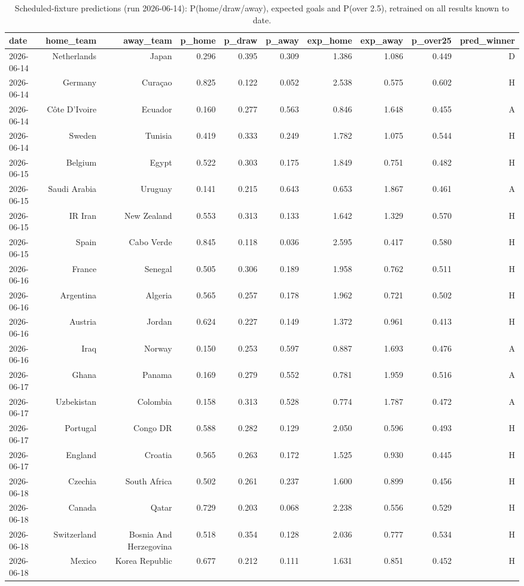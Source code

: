 \begin{table}[t]
  \centering
  \caption{Scheduled-fixture predictions (run 2026-06-14): P(home/draw/away), expected goals and P(over 2.5), retrained on all results known to date.}
  \label{tab:wc2026_predictions}
  \begin{tabular}{lrrrrrrrrr}
  \toprule
  date & home\_team & away\_team & p\_home & p\_draw & p\_away & exp\_home & exp\_away & p\_over25 & pred\_winner \\
  \midrule
  2026-06-14 & Netherlands & Japan & 0.296 & 0.395 & 0.309 & 1.386 & 1.086 & 0.449 & D \\
  2026-06-14 & Germany & Curaçao & 0.825 & 0.122 & 0.052 & 2.538 & 0.575 & 0.602 & H \\
  2026-06-14 & Côte D'Ivoire & Ecuador & 0.160 & 0.277 & 0.563 & 0.846 & 1.648 & 0.455 & A \\
  2026-06-14 & Sweden & Tunisia & 0.419 & 0.333 & 0.249 & 1.782 & 1.075 & 0.544 & H \\
  2026-06-15 & Belgium & Egypt & 0.522 & 0.303 & 0.175 & 1.849 & 0.751 & 0.482 & H \\
  2026-06-15 & Saudi Arabia & Uruguay & 0.141 & 0.215 & 0.643 & 0.653 & 1.867 & 0.461 & A \\
  2026-06-15 & IR Iran & New Zealand & 0.553 & 0.313 & 0.133 & 1.642 & 1.329 & 0.570 & H \\
  2026-06-15 & Spain & Cabo Verde & 0.845 & 0.118 & 0.036 & 2.595 & 0.417 & 0.580 & H \\
  2026-06-16 & France & Senegal & 0.505 & 0.306 & 0.189 & 1.958 & 0.762 & 0.511 & H \\
  2026-06-16 & Argentina & Algeria & 0.565 & 0.257 & 0.178 & 1.962 & 0.721 & 0.502 & H \\
  2026-06-16 & Austria & Jordan & 0.624 & 0.227 & 0.149 & 1.372 & 0.961 & 0.413 & H \\
  2026-06-16 & Iraq & Norway & 0.150 & 0.253 & 0.597 & 0.887 & 1.693 & 0.476 & A \\
  2026-06-17 & Ghana & Panama & 0.169 & 0.279 & 0.552 & 0.781 & 1.959 & 0.516 & A \\
  2026-06-17 & Uzbekistan & Colombia & 0.158 & 0.313 & 0.528 & 0.774 & 1.787 & 0.472 & A \\
  2026-06-17 & Portugal & Congo DR & 0.588 & 0.282 & 0.129 & 2.050 & 0.596 & 0.493 & H \\
  2026-06-17 & England & Croatia & 0.565 & 0.263 & 0.172 & 1.525 & 0.930 & 0.445 & H \\
  2026-06-18 & Czechia & South Africa & 0.502 & 0.261 & 0.237 & 1.600 & 0.899 & 0.456 & H \\
  2026-06-18 & Canada & Qatar & 0.729 & 0.203 & 0.068 & 2.238 & 0.556 & 0.529 & H \\
  2026-06-18 & Switzerland & Bosnia And Herzegovina & 0.518 & 0.354 & 0.128 & 2.036 & 0.777 & 0.534 & H \\
  2026-06-18 & Mexico & Korea Republic & 0.677 & 0.212 & 0.111 & 1.631 & 0.851 & 0.452 & H \\
  \bottomrule
  \end{tabular}
\end{table}
